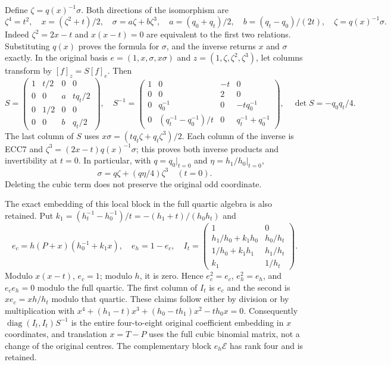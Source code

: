 \documentclass[11pt]{article}
\newcommand{\diag}{\operatorname{diag}}
\begin{document}
Define $\zeta=q(x)^{-1}\sigma$. Both directions of the isomorphism are
\begin{equation}
 \zeta^4=t^2,\quad x=(\zeta^2+t)/2,\quad
 \sigma=a\zeta+b\zeta^3,\quad
 a=(q_0+q_t)/2,\quad b=(q_t-q_0)/(2t),\quad
 \zeta=q(x)^{-1}\sigma.
 \tag{ECC8}
\end{equation}
Indeed $\zeta^2=2x-t$ and $x(x-t)=0$ are equivalent to the first two
relations. Substituting $q(x)$ proves the formula for $\sigma$, and
the inverse returns $x$ and $\sigma$ exactly. In the original basis
$e=(1,x,\sigma,x\sigma)$ and $z=(1,\zeta,\zeta^2,\zeta^3)$, let columns
transform by $[f]_z=S[f]_e$. Then
\begin{equation}
 S=\begin{pmatrix}1&t/2&0&0\\0&0&a&tq_t/2\\
 0&1/2&0&0\\0&0&b&q_t/2\end{pmatrix},\quad
 S^{-1}=\begin{pmatrix}
 1&0&-t&0\\0&0&2&0\\
 0&q_0^{-1}&0&-tq_0^{-1}\\
 0&(q_t^{-1}-q_0^{-1})/t&0&q_t^{-1}+q_0^{-1}
 \end{pmatrix},\quad \det S=-q_0q_t/4.
 \tag{ECC9}
\end{equation}
The last column of $S$ uses $x\sigma=(tq_t\zeta+q_t\zeta^3)/2$.
Each column of the inverse is ECC7 and
$\zeta^3=(2x-t)q(x)^{-1}\sigma$; this proves both inverse products and
invertibility at $t=0$. In particular, with $q=q_0|_{t=0}$ and
$\eta=h_1/h_0|_{t=0}$,
\begin{equation}
 \sigma=q\zeta+(q\eta/4)\zeta^3\quad(t=0).
 \tag{ECC10}
\end{equation}
Deleting the cubic term does not preserve the original odd coordinate.

The exact embedding of this local block in the full quartic algebra is
also retained. Put
$k_1=(h_t^{-1}-h_0^{-1})/t=-(h_1+t)/(h_0h_t)$ and
\begin{equation}
 e_c=h(P+x)(h_0^{-1}+k_1x),\quad e_h=1-e_c,\quad
 I_t=\begin{pmatrix}
 1&0\\h_1/h_0+k_1h_0&h_0/h_t\\
 1/h_0+k_1h_1&h_1/h_t\\k_1&1/h_t
 \end{pmatrix}.
 \tag{ECC11}
\end{equation}
Modulo $x(x-t)$, $e_c=1$; modulo $h$, it is zero. Hence $e_c^2=e_c$,
$e_h^2=e_h$, and $e_ce_h=0$ modulo the full quartic. The first column of
$I_t$ is $e_c$ and the second is $xe_c=xh/h_t$ modulo that quartic.
These claims follow either by division or by multiplication with
$x^4+(h_1-t)x^3+(h_0-th_1)x^2-th_0x=0$.
Consequently $\diag(I_t,I_t)S^{-1}$ is the entire four-to-eight original
coefficient embedding in $x$ coordinates, and translation $x=T-P$ uses
the full cubic binomial matrix, not a change of the original centres.
The complementary block $e_h\mathscr E$ has rank four and is retained.
\end{document}
